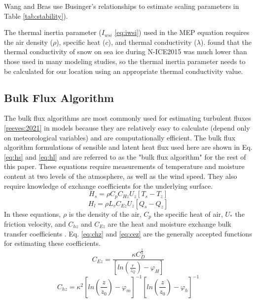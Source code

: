 Wang and Bras \citep{wang:2009} use Businger's relationships \citep{businger:1971} to estimate scaling parameters in Table \ref{tab:stability}). 

The thermal inertia parameter ($I_{wsi}$ \ref{eq:iwsi}) used in the MEP equation requires the air density ($\rho$), specific heat ($c$), and thermal conductivity ($\lambda$). \citet{merkouriadi:2017} found that the thermal conductivity of snow on sea ice during N-ICE2015 was much lower than those used in many modeling studies, so the thermal inertia parameter needs to be calculated for our location using an appropriate thermal conductivity value. 

\subsection{Bulk Flux Algorithm}
The bulk flux algorithms are most commonly used for estimating turbulent fluxes \ref{reeves:2021} in models because they are relatively easy to calculate (depend only on meteorological variables) and are computationally efficient. The bulk flux algorithm formulations of sensible and latent heat flux used here are shown in Eq. \ref{eq:hs} and \ref{eq:hl} and are referred to as the "bulk flux algorithm" for the rest of this paper. These equations require measurements of temperature and moisture content at two levels of the atmosphere, as well as the wind speed. They also require knowledge of exchange coefficients for the underlying surface.
\begin{equation}\label{eq:hs}
H_{s} = \rho C_{p} C_{Hz} U_{z} [T_{s} - T_{z}]
\end{equation}
\begin{equation}\label{eq:hl}
H_{l} = \rho L_{v} C_{Ez} U_{z} [Q_{s} - Q_{z}] 
\end{equation}
In these equations, $\rho$ is the density of the air, $C_{p}$ the specific heat of air, $U_{*}$ the friction velocity, and $C_{hz}$ and $C_{Ez}$ are the heat and moisture exchange bulk transfer coefficients \citep{foken:2008, andreas:311}. Eq. \ref{eq:chz} and \ref{eq:cez} are the generally accepted functions for estimating these coefficients. 
\begin{equation}\label{eq:cez}
C_{Ez} = \frac{\kappa C_{D}^{\frac{1}{2}}}{[ln(\frac{r}{z_{Q}})-\varphi_{H}]}
\end{equation}
\begin{equation}\label{eq:chz}
C_{hz} =  \kappa^{2} \left[ ln \left( \frac{z}{z_{0}} \right) - \varphi_{m} \right] ^{-1} \left[ ln \left( \frac{z}{z_{0}} \right) - \varphi_{h} \right] ^{-1}
\end{equation}

